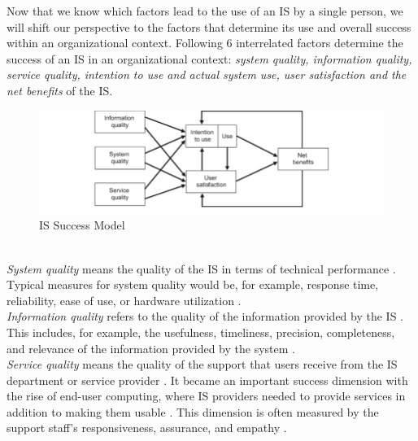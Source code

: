\documentclass[
	english,
	ruledheaders=section,%
	class=report,%
	thesis={type=bachelor},%
	accentcolor=1b,%
	custommargins=true,%
	marginpar=false,%
	parskip=half-,%
	fontsize=11pt,%
	DIV=14,
]{tudapub}
\begin{document}
Now that we know which factors lead to the use of an IS by a single person, we will shift our perspective to the factors that determine its use and overall success within an organizational context.
Following \cite[p.~23--24]{DeloneMcLean2003ISSuccessTenYearUpdate} 6 interrelated factors determine the success of an IS in an organizational context: \textit{system quality, information quality, service quality, intention to use and actual system use, user satisfaction and the net benefits} of the IS.\\
\begin{figure}[h!]
    \includegraphics[width=1\linewidth]{images/ISSuccess.png}
    \caption{IS Success Model \parencite[p.~24]{DeloneMcLean2003ISSuccessTenYearUpdate}}
    \label{fig:enter-label}
\end{figure}
\\
\textit{System quality} means the quality of the IS in terms of technical performance \parencite[p.~64]{DeloneMcLean2003ISSuccessTenYearUpdate}. Typical measures for system quality would be, for example, response time, reliability, ease of use, or hardware utilization \parencite[p.~64--65]{DeloneMcLean1992ISSuccess}.\\
\textit{Information quality} refers to the quality of the information provided by the IS \parencite[p.~64]{DeloneMcLean1992ISSuccess}. This includes, for example, the usefulness, timeliness, precision, completeness, and relevance of the information provided by the system \parencite[p.~67]{DeloneMcLean1992ISSuccess}.\\
\textit{Service quality} means the quality of the support that users receive from the IS department or service provider \parencite[p.~18]{DeloneMcLean2003ISSuccessTenYearUpdate}. It became an important success dimension with the rise of end-user computing, where IS providers needed to provide services in addition to making them usable \parencite[p.~18]{DeloneMcLean2003ISSuccessTenYearUpdate}. This dimension is often measured by the support staff's responsiveness, assurance, and empathy \parencite[p.~18]{DeloneMcLean2003ISSuccessTenYearUpdate}.
\\
\end{document}
